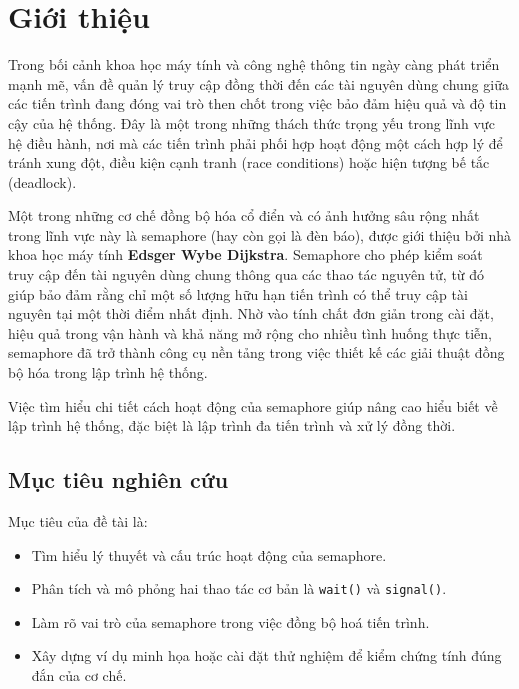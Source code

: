 \section{Giới thiệu}
Trong bối cảnh khoa học máy tính và công nghệ thông tin ngày càng phát triển mạnh mẽ, vấn đề quản lý truy cập đồng thời đến các tài nguyên dùng chung giữa các tiến trình đang đóng vai trò then chốt trong việc bảo đảm hiệu quả và độ tin cậy của hệ thống. Đây là một trong những thách thức trọng yếu trong lĩnh vực hệ điều hành, nơi mà các tiến trình phải phối hợp hoạt động một cách hợp lý để tránh xung đột, điều kiện cạnh tranh (race conditions) hoặc hiện tượng bế tắc (deadlock).

Một trong những cơ chế đồng bộ hóa cổ điển và có ảnh hưởng sâu rộng nhất trong lĩnh vực này là semaphore (hay còn gọi là đèn báo), được giới thiệu bởi nhà khoa học máy tính \textbf{Edsger Wybe Dijkstra}. Semaphore cho phép kiểm soát truy cập đến tài nguyên dùng chung thông qua các thao tác nguyên tử, từ đó giúp bảo đảm rằng chỉ một số lượng hữu hạn tiến trình có thể truy cập tài nguyên tại một thời điểm nhất định. Nhờ vào tính chất đơn giản trong cài đặt, hiệu quả trong vận hành và khả năng mở rộng cho nhiều tình huống thực tiễn, semaphore đã trở thành công cụ nền tảng trong việc thiết kế các giải thuật đồng bộ hóa trong lập trình hệ thống.

Việc tìm hiểu chi tiết cách hoạt động của semaphore giúp nâng cao hiểu biết
về lập trình hệ thống, đặc biệt là lập trình đa tiến trình và xử lý đồng thời.

\subsection{Mục tiêu nghiên cứu}
Mục tiêu của đề tài là:
\begin{itemize}
    \item Tìm hiểu lý thuyết và cấu trúc hoạt động của semaphore.
    \item Phân tích và mô phỏng hai thao tác cơ bản là \texttt{wait()} và \texttt{signal()}.
    \item Làm rõ vai trò của semaphore trong việc đồng bộ hoá tiến trình.
    \item Xây dựng ví dụ minh họa hoặc cài đặt thử nghiệm để kiểm chứng tính đúng đắn của cơ chế.
\end{itemize}